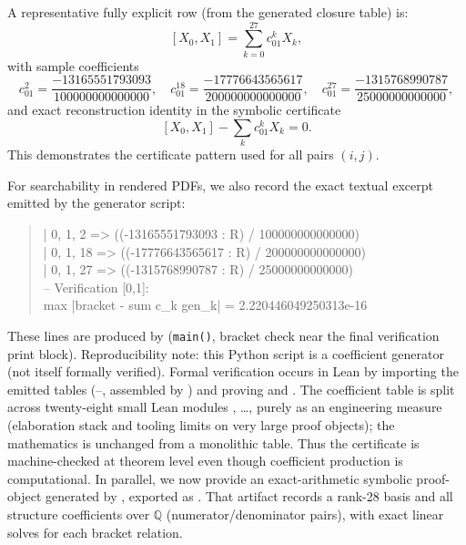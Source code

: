 \documentclass[11pt]{amsart}
\begin{document}
A representative fully explicit row (from the generated closure table) is:
\[
[X_0,X_1]
=\sum_{k=0}^{27} c_{01}^k X_k,
\]
with sample coefficients
\[
c_{01}^2=\frac{-13165551793093}{100000000000000},\quad
c_{01}^{18}=\frac{-17776643565617}{200000000000000},\quad
c_{01}^{27}=\frac{-1315768990787}{25000000000000},
\]
and exact reconstruction identity in the symbolic certificate
\[
[X_0,X_1]-\sum_k c_{01}^kX_k
=0.
\]
This demonstrates the certificate pattern used for all pairs $(i,j)$.

For searchability in rendered PDFs, we also record the exact textual excerpt
emitted by the generator script:
\begin{quote}\ttfamily\small
| 0, 1, 2 => ((-13165551793093 : R) / 100000000000000)\\
| 0, 1, 18 => ((-17776643565617 : R) / 200000000000000)\\
| 0, 1, 27 => ((-1315768990787 : R) / 25000000000000)\\
-- Verification [0,1]:\\
max |bracket - sum c\_k gen\_k| = 2.220446049250313e-16
\end{quote}
These lines are produced by 
(\texttt{main()}, bracket check near the final verification print block).
Reproducibility note: this Python script is a coefficient generator (not itself
formally verified). Formal verification occurs in Lean by importing the emitted
tables (--,
assembled by ) and proving
 and .
The coefficient table is split across twenty-eight small Lean modules , \ldots,  purely as an engineering measure (elaboration stack and tooling limits on very large proof objects); the mathematics is unchanged from a monolithic table.
Thus the certificate is machine-checked at theorem level even though coefficient
production is computational.
In parallel, we now provide an exact-arithmetic symbolic proof-object generated
by , exported as
. That artifact records a rank-28
basis and all structure coefficients over \(\mathbb Q\) (numerator/denominator
pairs), with exact linear solves for each bracket relation.
\end{document}
